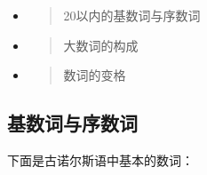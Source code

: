 \begin{itemize}
\item
  \begin{quote}
  20以内的基数词与序数词
  \end{quote}
\item
  \begin{quote}
  大数词的构成
  \end{quote}
\item
  \begin{quote}
  数词的变格
  \end{quote}
\end{itemize}

\subsection{\texorpdfstring{\textbf{基数词与序数词}}{基数词与序数词}}\label{ux57faux6570ux8bcdux4e0eux5e8fux6570ux8bcd}

下面是古诺尔斯语中基本的数词：

